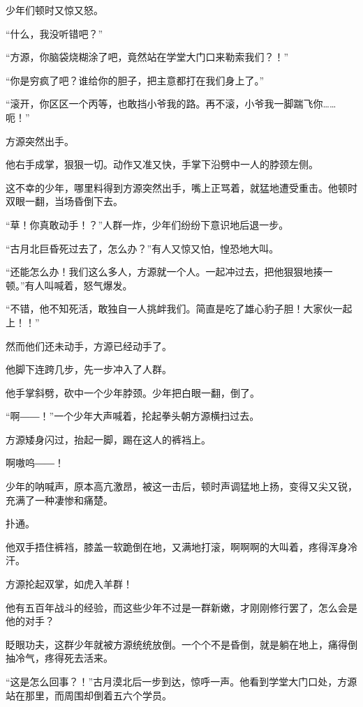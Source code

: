 
\begin{this_body}

少年们顿时又惊又怒。

“什么，我没听错吧？”

“方源，你脑袋烧糊涂了吧，竟然站在学堂大门口来勒索我们？！”

“你是穷疯了吧？谁给你的胆子，把主意都打在我们身上了。”

“滚开，你区区一个丙等，也敢挡小爷我的路。再不滚，小爷我一脚踹飞你……呃！”

方源突然出手。

他右手成掌，狠狠一切。动作又准又快，手掌下沿劈中一人的脖颈左侧。

这不幸的少年，哪里料得到方源突然出手，嘴上正骂着，就猛地遭受重击。他顿时双眼一翻，当场昏倒下去。

“草！你真敢动手！？”人群一炸，少年们纷纷下意识地后退一步。

“古月北巨昏死过去了，怎么办？”有人又惊又怕，惶恐地大叫。

“还能怎么办！我们这么多人，方源就一个人。一起冲过去，把他狠狠地揍一顿。”有人叫喊着，怒气爆发。

“不错，他不知死活，敢独自一人挑衅我们。简直是吃了雄心豹子胆！大家伙一起上！！”

然而他们还未动手，方源已经动手了。

他脚下连跨几步，先一步冲入了人群。

他手掌斜劈，砍中一个少年脖颈。少年把白眼一翻，倒了。

“啊――！”一个少年大声喊着，抡起拳头朝方源横扫过去。

方源矮身闪过，抬起一脚，踢在这人的裤裆上。

啊嗷呜――！

少年的呐喊声，原本高亢激昂，被这一击后，顿时声调猛地上扬，变得又尖又锐，充满了一种凄惨和痛楚。

扑通。

他双手捂住裤裆，膝盖一软跪倒在地，又满地打滚，啊啊啊的大叫着，疼得浑身冷汗。

方源抡起双掌，如虎入羊群！

他有五百年战斗的经验，而这些少年不过是一群新嫩，才刚刚修行罢了，怎么会是他的对手？

眨眼功夫，这群少年就被方源统统放倒。一个个不是昏倒，就是躺在地上，痛得倒抽冷气，疼得死去活来。

“这是怎么回事？！”古月漠北后一步到达，惊呼一声。他看到学堂大门口处，方源站在那里，而周围却倒着五六个学员。


\end{this_body}
